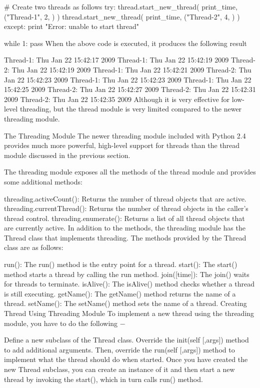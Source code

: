 # Create two threads as follows
try:
   thread.start_new_thread( print_time, ("Thread-1", 2, ) )
   thread.start_new_thread( print_time, ("Thread-2", 4, ) )
except:
   print "Error: unable to start thread"

while 1:
   pass
When the above code is executed, it produces the following result

Thread-1: Thu Jan 22 15:42:17 2009
Thread-1: Thu Jan 22 15:42:19 2009
Thread-2: Thu Jan 22 15:42:19 2009
Thread-1: Thu Jan 22 15:42:21 2009
Thread-2: Thu Jan 22 15:42:23 2009
Thread-1: Thu Jan 22 15:42:23 2009
Thread-1: Thu Jan 22 15:42:25 2009
Thread-2: Thu Jan 22 15:42:27 2009
Thread-2: Thu Jan 22 15:42:31 2009
Thread-2: Thu Jan 22 15:42:35 2009
Although it is very effective for low-level threading, but the thread module is very limited compared to the newer threading module.

The Threading Module
The newer threading module included with Python 2.4 provides much more powerful, high-level support for threads than the thread module discussed in the previous section.

The threading module exposes all the methods of the thread module and provides some additional methods:

threading.activeCount(): Returns the number of thread objects that are active.
threading.currentThread(): Returns the number of thread objects in the caller's thread control.
threading.enumerate(): Returns a list of all thread objects that are currently active.
In addition to the methods, the threading module has the Thread class that implements threading. The methods provided by the Thread class are as follows:

run(): The run() method is the entry point for a thread.
start(): The start() method starts a thread by calling the run method.
join([time]): The join() waits for threads to terminate.
isAlive(): The isAlive() method checks whether a thread is still executing.
getName(): The getName() method returns the name of a thread.
setName(): The setName() method sets the name of a thread.
Creating Thread Using Threading Module
To implement a new thread using the threading module, you have to do the following −

Define a new subclass of the Thread class.
Override the init(self [,args]) method to add additional arguments.
Then, override the run(self [,args]) method to implement what the thread should do when started.
Once you have created the new Thread subclass, you can create an instance of it and then start a new thread by invoking the start(), which in turn calls run() method.

